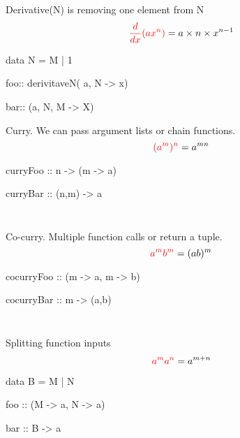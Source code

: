 \documentclass{beamer}
\begin{document}
\begin{frame}[fragile]
Derivative(N) is removing one element from N
$$ \textcolor{red}{{d \over dx}(ax^{n}) }= a \times n \times x^{n-1}$$
\begin{code}
data N = M | 1
\end{code}
\color{red}
\begin{code}
foo::  derivitaveN( a, N -> x)
\end{code}
\color{black}
\begin{code}
bar:: (a, N, M -> X)
\end{code}
\end{frame}

\begin{frame}[fragile]
Curry. We can pass argument lists or chain functions.
$$ \textcolor{red}{(a^{m})^{n}} = a^{mn}$$

\color{red}
\begin{code}
curryFoo :: n -> (m -> a)
\end{code}
\color{black}
\begin{code}
curryBar :: (n,m) -> a
\end{code}
\end{frame}

\begin{frame}[fragile]
\inputminted{Ruby}{curry.rb}


\inputminted{text}{curry.out}
\end{frame}



\begin{frame}[fragile]
Co-curry. Multiple function calls or return a tuple.
$$ \textcolor{red}{a^{m}b^{m}} = (ab)^{m}$$

\color{red}
\begin{code}
cocurryFoo :: (m -> a, m -> b)
\end{code}
\color{black}
\begin{code}
cocurryBar :: m -> (a,b)
\end{code}
\end{frame}

\begin{frame}[fragile]
\inputminted{Ruby}{cocurry.rb}


\inputminted{text}{cocurry.out}
\end{frame}


\begin{frame}[fragile]
Splitting function inputs
$$\textcolor{red}{a^{m}a^{n} }= a^{m+n}$$
\begin{code}
data B = M | N
\end{code}
\color{red}
\begin{code}
foo :: (M -> a, N -> a)
\end{code}
\color{black}
\begin{code}
bar :: B -> a
\end{code}
\end{frame}
\end{document}
